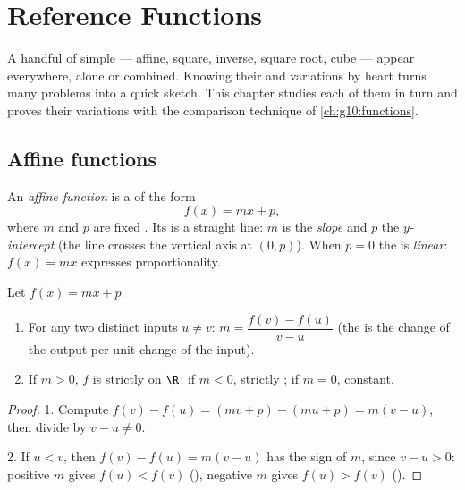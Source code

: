 \chapter{Reference Functions}\label{ch:g10:reffunc}

A handful of simple  --- affine, square, inverse, square root,
cube --- appear everywhere, alone or combined. Knowing their  and
variations by heart turns many problems into a quick sketch. This chapter
studies each of them in turn and proves their variations with the
comparison technique of \cref{ch:g10:functions}.

\section{Affine functions}

\begin{definition}\label{def:g10:reffunc:affine}
An \emph{affine function} is a  of the form
\[
f(x) = mx + p,
\]
where $m$ and $p$ are fixed . Its  is a straight line:
$m$ is the \emph{slope} and $p$ the
\emph{$y$-intercept} (the line crosses
the vertical axis at $(0, p)$). When $p = 0$ the  is
\emph{linear}: $f(x) = mx$ expresses proportionality.
\end{definition}

\begin{proposition}\label{prop:g10:reffunc:affine}
Let $f(x) = mx + p$.
\begin{enumerate}
  \item For any two distinct inputs $u \neq v$:
        $m = \dfrac{f(v) - f(u)}{v - u}$ (the  is the change of the
        output per unit change of the input).
  \item If $m > 0$, $f$ is strictly  on $\R$; if $m < 0$,
        strictly ; if $m = 0$, constant.
\end{enumerate}
\end{proposition}

\begin{proof}
1. Compute $f(v) - f(u) = (mv + p) - (mu + p) = m(v - u)$, then divide by
$v - u \neq 0$.

2. If $u < v$, then $f(v) - f(u) = m(v-u)$ has the sign of $m$, since
$v - u > 0$: positive $m$ gives $f(u) < f(v)$ (), negative $m$
gives $f(u) > f(v)$ ().
\end{proof}

